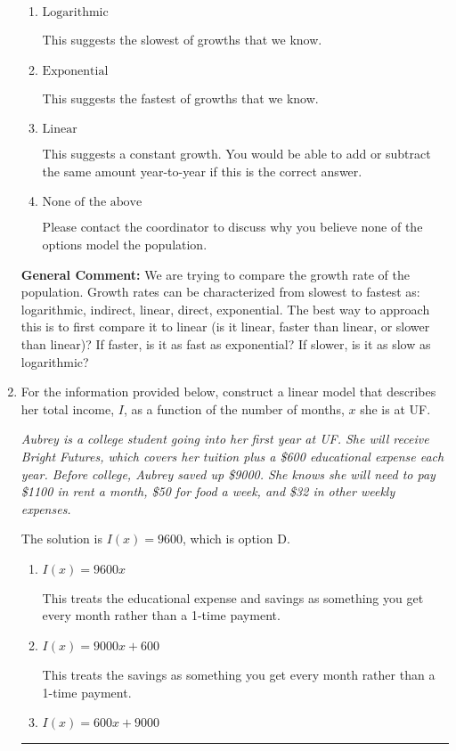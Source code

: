 \documentclass{extbook}[14pt]
\newcommand{\litem}[1]{\item #1

\rule{\textwidth}{0.4pt}}
\begin{document}
\begin{enumerate}
{\begin{enumerate}[label=\Alph*.]
This suggests a growth faster than constant but slower than exponential.
\item \( \text{Logarithmic} \)

This suggests the slowest of growths that we know.
\item \( \text{Exponential} \)

This suggests the fastest of growths that we know.
\item \( \text{Linear} \)

This suggests a constant growth. You would be able to add or subtract the same amount year-to-year if this is the correct answer.
\item \( \text{None of the above} \)

Please contact the coordinator to discuss why you believe none of the options model the population.
\end{enumerate}

\textbf{General Comment:} We are trying to compare the growth rate of the population. Growth rates can be characterized from slowest to fastest as: logarithmic, indirect, linear, direct, exponential. The best way to approach this is to first compare it to linear (is it linear, faster than linear, or slower than linear)? If faster, is it as fast as exponential? If slower, is it as slow as logarithmic?
}
\litem{
For the information provided below, construct a linear model that describes her total income, $I$, as a function of the number of months, $x$ she is at UF.

\begin{center}
    \textit{ Aubrey is a college student going into her first year at UF. She will receive Bright Futures, which covers her tuition plus a \$600 educational expense each year. Before college, Aubrey saved up \$9000. She knows she will need to pay \$1100 in rent a month, \$50 for food a week, and \$32 in other weekly expenses. }
\end{center}
The solution is \( I(x) = 9600 \), which is option D.\begin{enumerate}[label=\Alph*.]
\item \( I(x) = 9600 x \)

This treats the educational expense and savings as something you get every month rather than a 1-time payment.
\item \( I(x) = 9000 x + 600 \)

This treats the savings as something you get every month rather than a 1-time payment.
\item \( I(x) = 600 x + 9000 \)


\end{enumerate}}
\end{enumerate}
\end{document}
